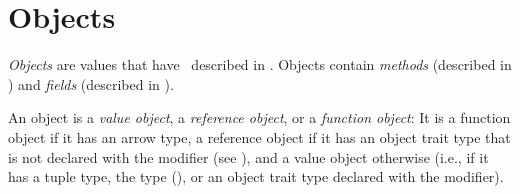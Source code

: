 %
%
%
%

\chapter{Objects}


\emph{Objects} are values that have \objecttypes\ described in
.
Objects contain \emph{methods} (described in ) and
\emph{fields} (described in ).

An object is a \emph{value object}, a \emph{reference object},
or a \emph{function object}:
It is a function object if it has an arrow type,
a reference object if it has an object trait type
that is not declared with the  modifier
(see ),
and a value object otherwise
(i.e., if it has a tuple type, the type (),
or an object trait type declared
with the  modifier).

